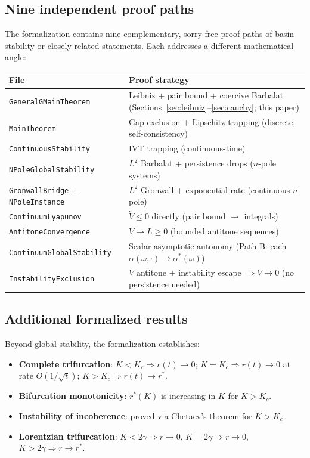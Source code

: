 \documentclass[11pt,a4paper]{article}
\theoremstyle{definition}
\begin{document}
\subsection{Nine independent proof paths}

The formalization contains nine complementary, sorry-free proof paths of basin stability or closely related statements. Each addresses a different mathematical angle:

\medskip
\begin{center}
\begin{tabular}{lp{9cm}}
\textbf{File} & \textbf{Proof strategy} \\
\hline
\texttt{GeneralGMainTheorem} & Leibniz + pair bound + coercive Barbalat (Sections~\ref{sec:leibniz}--\ref{sec:cauchy}; this paper) \\
\texttt{MainTheorem} & Gap exclusion + Lipschitz trapping (discrete, self-consistency) \\
\texttt{ContinuousStability} & IVT trapping (continuous-time) \\
\texttt{NPoleGlobalStability} & $L^2$ Barbalat + persistence drops ($n$-pole systems) \\
\texttt{GronwallBridge} + \texttt{NPoleInstance} & $L^2$ Gronwall + exponential rate (continuous $n$-pole) \\
\texttt{ContinuumLyapunov} & $\dot{V} \leq 0$ directly (pair bound $\to$ integrals) \\
\texttt{AntitoneConvergence} & $V \to L \geq 0$ (bounded antitone sequences) \\
\texttt{ContinuumGlobalStability} & Scalar asymptotic autonomy (Path B: each $\alpha(\omega,\cdot) \to \alpha^*(\omega)$) \\
\texttt{InstabilityExclusion} & $V$ antitone + instability escape $\Rightarrow V \to 0$ (no persistence needed)
\end{tabular}
\end{center}

\subsection{Additional formalized results}

Beyond global stability, the formalization establishes:

\begin{itemize}
\item \textbf{Complete trifurcation}: $K < K_c \Rightarrow r(t) \to 0$; $K = K_c \Rightarrow r(t) \to 0$ at rate $O(1/\sqrt{t})$; $K > K_c \Rightarrow r(t) \to r^*$.
\item \textbf{Bifurcation monotonicity}: $r^*(K)$ is increasing in $K$ for $K > K_c$.
\item \textbf{Instability of incoherence}: proved via Chetaev's theorem for $K > K_c$.
\item \textbf{Lorentzian trifurcation}: $K < 2\gamma \Rightarrow r \to 0$, $K = 2\gamma \Rightarrow r \to 0$, $K > 2\gamma \Rightarrow r \to r^*$.
\end{itemize}
\end{document}
